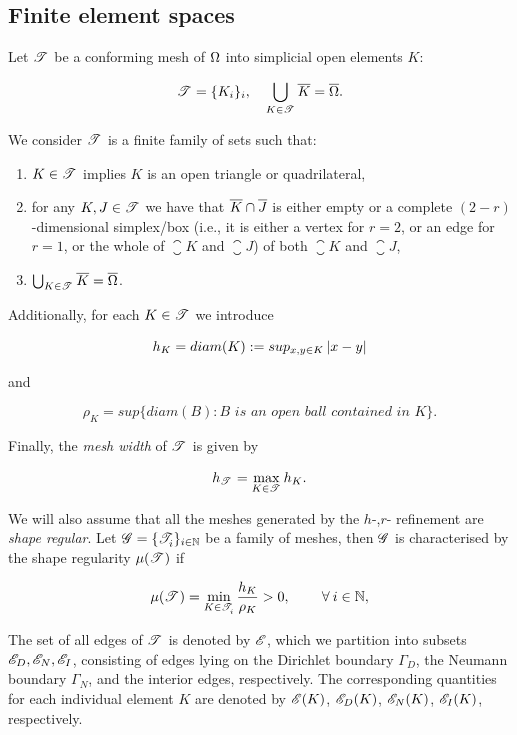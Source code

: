 \documentclass[a4paper,11pt]{article}
\begin{document}
\subsection{Finite element spaces}

Let $\mathscr T^{}$ be a conforming mesh of $\Omega$ into simplicial open elements $K$:

$$ \mathscr T^{} = \{K_{i}\}_{i}, \quad \bigcup_{K \in \mathscr T^{}} \overline{K} = \overline{\Omega}.$$

We consider $\mathscr T^{}$ is a finite family of sets such
that:
\begin{enumerate}
\item $K\in\mathscr T^{}$ implies $K$ is an open triangle or quadrilateral,
\item for any $K,J\in\mathscr T^{}$ we have that $\overline{K}\cap\overline{J}$ is either empty or
  a complete $(2-r)$-dimensional simplex/box (i.e., it is either a vertex for $r=2$, or an
  edge for $r=1$, or the whole of $\closure K$ and $\closure J$) of both
  $\closure K$ and $\closure J$,
\item $\bigcup_{K\in\mathscr T^{}}\overline{K}=\overline{\Omega}$.
\end{enumerate}

Additionally, for each $K \in \mathscr T^{}$ we introduce 

$$h_{K} = diam(K) := sup_{x,y \in K} \left|x - y\right| $$

and 

$$\rho_{K} = sup\{diam(B) : B \textit{ is an open ball contained in } K\}. $$

Finally, the \textit{mesh width} of $\mathscr T^{}$ is given by

$$h_{\mathscr T^{}} = \max_{K \in \mathscr T^{}} h_{K}.$$

We will also assume that all the meshes generated by the $h$-,$r$- refinement are \textit{shape regular}. Let $\mathscr G = \{ \mathscr T^{}_{i} \}_{i\in \mathbb N}$ be a family of meshes, then $\mathscr G$ is characterised by the shape regularity $\mu(\mathscr T^{})$ if
    
\begin{equation}
        \mu(\mathscr T^{}) = \min_{K\in \mathscr T^{}_{i}}\frac{h_{K}}{\rho_{K}} > 0, \quad \quad\:\forall\: i \in \mathbb{N},
\label{eq:shape_regularity}
\end{equation}
    
The set of all edges of $\mathscr T^{}$ is denoted by $\mathscr E$, which we partition into subsets $\mathscr E_{D}, \mathscr E_{N}, \mathscr E_{I}$, consisting of edges lying on the Dirichlet boundary $\Gamma_{D}$, the Neumann boundary $\Gamma_{N}$, and the interior edges, respectively. The corresponding quantities for each individual element $K$ are denoted by $\mathscr E(K)$, $\mathscr E_{D}(K)$, $\mathscr E_{N}(K)$, $\mathscr E_{I}(K)$, respectively. 
\end{document}
